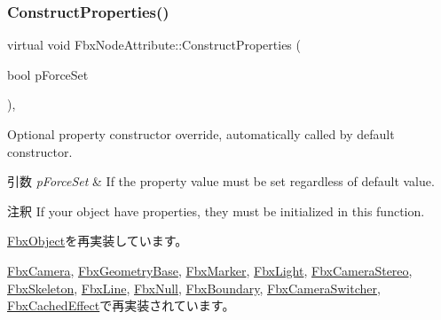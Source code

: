 \subsubsection{\texorpdfstring{Construct\+Properties()}{ConstructProperties()}}
{\footnotesize\ttfamily virtual void Fbx\+Node\+Attribute\+::\+Construct\+Properties (\begin{DoxyParamCaption}\item[{bool}]{p\+Force\+Set }\end{DoxyParamCaption})\hspace{0.3cm}{\ttfamily [protected]}, {\ttfamily [virtual]}}

Optional property constructor override, automatically called by default constructor. 
\begin{DoxyParams}{引数}
{\em p\+Force\+Set} & If the property value must be set regardless of default value. \\
\hline
\end{DoxyParams}
\begin{DoxyRemark}{注釈}
If your object have properties, they must be initialized in this function. 
\end{DoxyRemark}


\hyperlink{class_fbx_object_ad44f814323dc1b5e78bff1bfc608b4bb}{Fbx\+Object}を再実装しています。



\hyperlink{class_fbx_camera_a11334e5358efacbd87e4a7d78036155d}{Fbx\+Camera}, \hyperlink{class_fbx_geometry_base_a94ee142ac1d40be3aebb4d9441431921}{Fbx\+Geometry\+Base}, \hyperlink{class_fbx_marker_a02a9ec30c7dc256cce288e2f9961b507}{Fbx\+Marker}, \hyperlink{class_fbx_light_aaa406a871272d3f36c6300ab81f312c5}{Fbx\+Light}, \hyperlink{class_fbx_camera_stereo_a83a9b1ee59d0014b30411fe4877b5dec}{Fbx\+Camera\+Stereo}, \hyperlink{class_fbx_skeleton_aa1e8d4dbe577415b4e00914ae75d46a0}{Fbx\+Skeleton}, \hyperlink{class_fbx_line_a48df4b6cd889814d3fe7ca5bb09bcc78}{Fbx\+Line}, \hyperlink{class_fbx_null_a5074b9c24389b6b0017e156566469421}{Fbx\+Null}, \hyperlink{class_fbx_boundary_acb50e021b1e9920026c975613a949537}{Fbx\+Boundary}, \hyperlink{class_fbx_camera_switcher_a38011053f3a61df4e93989d7c970fa16}{Fbx\+Camera\+Switcher}, \hyperlink{class_fbx_cached_effect_a0a33b753735747046809b241eadb19d2}{Fbx\+Cached\+Effect}で再実装されています。

\mbox{\label{class_fbx_node_attribute_a1c2116756906127145a2b8721fc26752}} 
